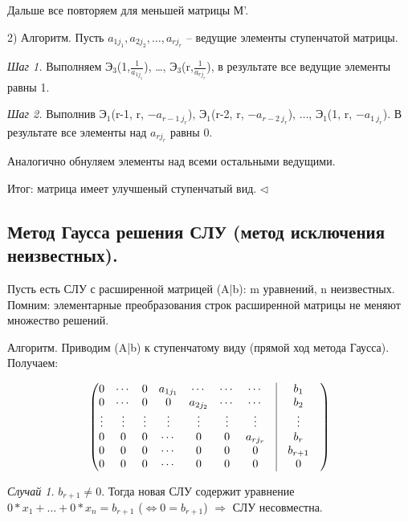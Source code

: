Дальше все повторяем для меньшей матрицы М'.

\vspace{\baselineskip}
2) Алгоритм. Пусть $a_{1j_1}, a_{2j_2}, \dots, a_{rj_r}$ -- ведущие элементы ступенчатой матрицы.

\textit{Шаг 1.} Выполняем $Э_3$(1,$\frac{1}{a_{1j_1}}$), \dots, $Э_3$(r,$\frac{1}{a_{rj_r}}$), в результате все ведущие элементы равны 1.

\textit{Шаг 2.} Выполнив $Э_1$(r-1, r, $-a_{{r-1}\ j_r}$), $Э_1$(r-2, r, $-a_{{r-2}\ j_r}$), $\dots$, $Э_1$(1, r, $-a_{1\ j_r}$). В результате все элементы над $a_{rj_r}$ равны 0.

Аналогично обнуляем элементы над всеми остальными ведущими. 

Итог: матрица имеет улучшеный ступенчатый вид. $\lhd$

\vspace{\baselineskip}
\subsection{Метод Гаусса решения СЛУ (метод исключения неизвестных).}

Пусть есть СЛУ с расширенной матрицей (A|b): m уравнений, n неизвестных. Помним: элементарные преобразования строк расширенной матрицы не меняют множество решений.

Алгоритм. Приводим (A|b) к ступенчатому виду (прямой ход метода Гаусса). Получаем: 

\begin{equation*}
	\begin{pmatrix}
		0 & \cdots & 0 & a_{1j_1} & \cdots & \cdots & \cdots & \vrule & b_1 \\
		0 & \cdots & 0 & 0 & a_{2j_2} & \cdots & \cdots & \vrule & b_2 \\
       \vdots & \vdots & \vdots& \vdots & \vdots & \vdots & \vdots & \vrule & \vdots & \\ 
       0 & 0 & 0 & \cdots & 0 & 0 & a_{rj_r} & \vrule & b_r \\
       0 & 0 & 0 & \cdots & 0 & 0 & 0 & \vrule & b_{r+1} \\
       0 & 0 & 0 & \cdots & 0 & 0 & 0 & \vrule & 0
	\end{pmatrix}
\end{equation*}


\textit{Случай 1.} $b_{r+1} \neq 0$. Тогда новая СЛУ содержит уравнение $0*x_1 + \dots + 0*x_n = b_{r+1}$ ($\Leftrightarrow 0 = b_{r+1}$) $\Rightarrow$ СЛУ несовместна.


